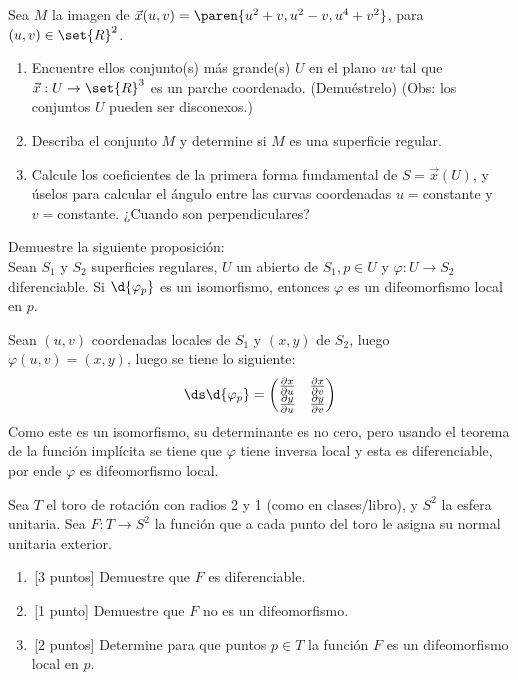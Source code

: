 \documentclass{homework}
\begin{document}
\begin{prob}
    Sea \(M\) la imagen de \(\vec{x}(u,v)=\paren{u^2+v,u^2-v,u^4+v^2}\), para \((u,v)\in\set{R}^2\).
    \begin{enumerate}
        \item Encuentre el\/los conjunto(s) más grande(s) \(U\) en el plano \(uv\) tal que \(\vec{x}:U\rightarrow\set{R}^3\) es un parche coordenado. (Demuéstrelo) (Obs: los conjuntos \(U\) pueden ser disconexos.)
        \item Describa el conjunto \(M\) y determine si \(M\) es una superficie regular.
        \item Calcule los coeficientes de la primera forma fundamental de \(S=\vec{x}(U)\), y úselos para calcular el ángulo entre las curvas coordenadas \(u=\)constante y \(v=\)constante. ¿Cuando son perpendiculares?
    \end{enumerate}
\end{prob}

\begin{sol}
    
\end{sol}


\begin{prob}
    Demuestre la siguiente proposición:\\
    Sean \(S_1\) y \(S_2\) superficies regulares, \(U\) un abierto de \(S_1,p\in U\) y \(\varphi:U\rightarrow S_2\) diferenciable. Si \(\d{\varphi_p}\) es un isomorfismo, entonces \(\varphi\) es un difeomorfismo local en \(p\).
\end{prob}

\begin{sol}
    Sean \((u,v)\) coordenadas locales de \(S_1\) y \((x,y)\) de \(S_2\), luego \(\varphi(u,v)=(x,y)\), luego se tiene lo siguiente:
    \[\ds\d{\varphi_p}=\begin{pmatrix}
        \frac{\partial x}{\partial u} &\frac{\partial x}{\partial v}\\
        \frac{\partial y}{\partial u} &\frac{\partial y}{\partial v}
    \end{pmatrix}\]
    Como este es un isomorfismo, su determinante es no cero, pero usando el teorema de la función implícita se tiene que \(\varphi\) tiene inversa local y esta es diferenciable, por ende \(\varphi\) es difeomorfismo local.
\end{sol}


\begin{prob}
    Sea \(T\) el toro de rotación con radios 2 y 1 (como en clases/libro), y \(S^2\) la esfera unitaria. Sea \(F:T\rightarrow S^2\) la función que a cada punto del toro le asigna su normal unitaria exterior.
    \begin{enumerate}
        \item \,[3 puntos] Demuestre que \(F\) es diferenciable.
        \item \,[1 punto] Demuestre que \(F\) no es un difeomorfismo.
        \item \,[2 puntos] Determine para que puntos \(p\in T\) la función \(F\) es un difeomorfismo local en \(p\).
    \end{enumerate}
\end{prob}
\end{document}
